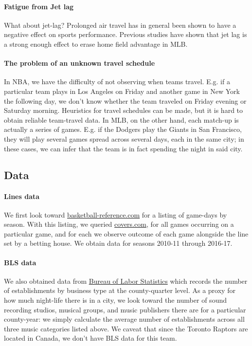 \documentclass[letterpaper,12pt]{article}
\begin{document}
\paragraph{Fatigue from Jet lag}
What about jet-lag? Prolonged air travel has in general been shown
to have a negative effect on sports performance.\cite{leeandgalvez}
Previous studies have shown that jet lag is a strong enough effect
to erase home field advantage in MLB.\cite{songetal}

\paragraph{The problem of an unknown travel schedule} In NBA, we have the difficulty of not observing when teams travel. E.g. if a particular team  plays
in Los Angeles on Friday and another game in New York the following day, we don't
know whether the team traveled on Friday evening or Saturday morning. Heuristics for
travel schedules can be made, but it is hard to obtain reliable team-travel data.
In MLB, on the other hand, each match-up is actually a series of games. E.g.
if the Dodgers play the Giants in San Francisco, they will play several games spread
across several days, each in the same city; in these cases, we can infer that the team
is in fact spending the night in said city.


\subsection{Data}
\paragraph{Lines data} We first look toward 
\href{http://www.basketball-reference.com/leagues/}{basketball-reference.com}
for a listing of game-days by season. With this listing, we queried \href{http://www.covers.com/sports/NBA/matchups?selectedDate=2011-1-01}{covers.com},
for all games occurring on a particular game, and for each we observe
outcome of each game alongside the line set by a betting house. We obtain
data for seasons 2010-11 through 2016-17.


\paragraph{BLS data} We also obtained data from
\href{https://www.bls.gov/data/}{Bureau of Labor Statistics} which records the number of establishments by business type at the county-quarter level. As a 
proxy for how much night-life there is in a city, we look toward the 
number of sound recording studios, musical groups, and music publishers there 
are for a particular county-year: we simply calculate the average number of establishments across all three music categories listed above. We caveat that since the Toronto Raptors are located in Canada, we don't have BLS data for this team.
\end{document}
